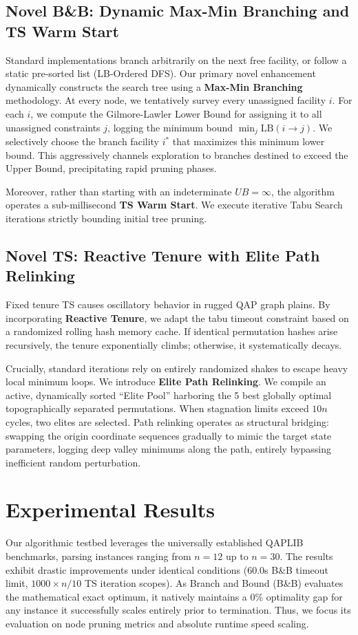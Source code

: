 \documentclass[sigconf,nonacm]{acmart}
\begin{document}
\subsection{Novel B\&B: Dynamic Max-Min Branching and TS Warm Start}
Standard implementations branch arbitrarily on the next free facility, or follow a static pre-sorted list (LB-Ordered DFS). 
Our primary novel enhancement dynamically constructs the search tree using a \textbf{Max-Min Branching} methodology. At every node, we tentatively survey every unassigned facility $i$. For each $i$, we compute the Gilmore-Lawler Lower Bound for assigning it to all unassigned constraints $j$, logging the minimum bound $\min_j \text{LB}(i \to j)$. We selectively choose the branch facility $i^*$ that maximizes this minimum lower bound. This aggressively channels exploration to branches destined to exceed the Upper Bound, precipitating rapid pruning phases.

Moreover, rather than starting with an indeterminate $UB=\infty$, the algorithm operates a sub-millisecond \textbf{TS Warm Start}. We execute iterative Tabu Search iterations strictly bounding initial tree pruning.

\subsection{Novel TS: Reactive Tenure with Elite Path Relinking}
Fixed tenure TS causes oscillatory behavior in rugged QAP graph plains. By incorporating \textbf{Reactive Tenure}, we adapt the tabu timeout constraint based on a randomized rolling hash memory cache. If identical permutation hashes arise recursively, the tenure exponentially climbs; otherwise, it systematically decays.

Crucially, standard iterations rely on entirely randomized shakes to escape heavy local minimum loops. We introduce \textbf{Elite Path Relinking}. We compile an active, dynamically sorted ``Elite Pool” harboring the 5 best globally optimal topographically separated permutations. When stagnation limits exceed $10n$ cycles, two elites are selected. Path relinking operates as structural bridging: swapping the origin coordinate sequences gradually to mimic the target state parameters, logging deep valley minimums along the path, entirely bypassing inefficient random perturbation.

\section{Experimental Results}
Our algorithmic testbed leverages the universally established QAPLIB benchmarks, parsing instances ranging from $n=12$ up to $n=30$. The results exhibit drastic improvements under identical conditions (60.0s B\&B timeout limit, $1000 \times n/10$ TS iteration scopes). As Branch and Bound (B\&B) evaluates the mathematical exact optimum, it natively maintains a 0\% optimality gap for any instance it successfully scales entirely prior to termination. Thus, we focus its evaluation on node pruning metrics and absolute runtime speed scaling.
\end{document}
